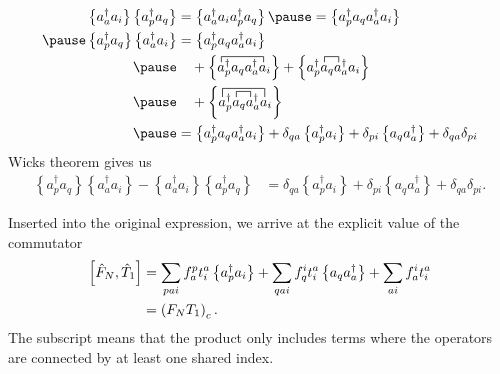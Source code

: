        \begin{align*}
            \left\{a_a^\dagger a_i\right\} \left\{a_p^\dagger a_q \right\} &= \normord{a_a^\dagger a_i a_p^\dagger a_q} \pause
                = \normord{a_p^\dagger a_q a_a^\dagger a_i} \\ \pause
        \normord{a_p^\dagger a_q}\normord{a_a^\dagger a_i} &= \normord{a_p^\dagger a_q a_a^\dagger a_i}  \\ \pause
            & \quad + \normord{
               \contraction{}{a}{{}^\dagger_pa_q a^\dagger_a}{a}
                a^\dagger_p a_q a^\dagger_a a_i} +
            \normord{
                \contraction{a^\dagger_p}{a}{{}_q}{a}
                a^\dagger_p a_q a^\dagger_a a_i} \\ \pause
            & \quad + \normord{
                \contraction[1.5ex]{}{a}{{}^\dagger_pa_q a^\dagger_a}{a}
                \contraction{a^\dagger_p}{a}{{}_q}{a}
                a^\dagger_p a_q a^\dagger_a a_i} \\ \pause
            &=  \normord{a_p^\dagger a_q a_a^\dagger a_i} + \delta_{qa} \normord{a_p^\dagger a_i} + \delta_{pi} \normord{a_q a_a^\dagger}
            + \delta_{qa}\delta_{pi}
        \end{align*}
        Wicks theorem gives us
        \begin{align*}
            \left\{a_p^\dagger a_q \right\}\left\{a_a^\dagger a_i\right\} - \left\{a_a^\dagger a_i\right\} \left\{a_p^\dagger a_q \right\} &= \delta_{qa} \left\{ a_p^\dagger a_i\right\} + \delta_{pi} \left\{ a_q a_a^\dagger \right\} + \delta_{qa}\delta_{pi}.
    \end{align*}

        Inserted into the original expression, we arrive at the explicit value of the commutator
        \begin{align*}
        \left[ \hat{F}_N, \hat{T}_1 \right] &= \sum_{pai} f_a^p t_i^a \left\{a_p^\dagger a_i\right\} + 
                \sum_{qai} f_q^i t_i^a \left\{a_q a_a^\dagger\right\} + \sum_{ai} f_a^i t_i^a \\
            &= \left( F_N T_1 \right)_c.
        \end{align*}
    The subscript means that the product only includes terms where the operators are connected by at least one shared index.

